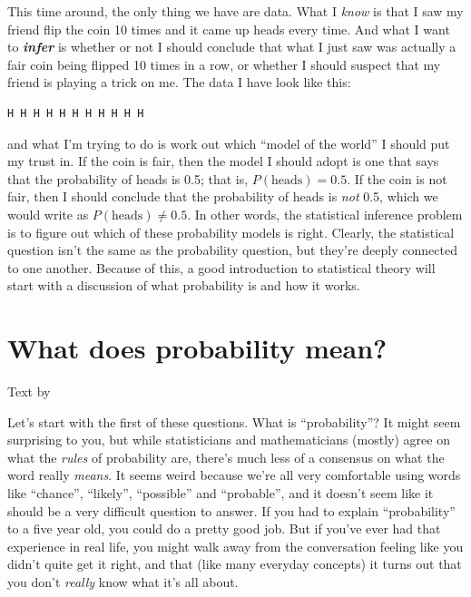 \documentclass[
]{book}
\begin{document}
This time around, the only thing we have are data. What I \emph{know} is that I saw my friend flip the coin 10 times and it came up heads every time. And what I want to \textbf{\emph{infer}} is whether or not I should conclude that what I just saw was actually a fair coin being flipped 10 times in a row, or whether I should suspect that my friend is playing a trick on me. The data I have look like this:

\begin{verbatim}
H H H H H H H H H H H
\end{verbatim}

and what I'm trying to do is work out which ``model of the world'' I should put my trust in. If the coin is fair, then the model I should adopt is one that says that the probability of heads is 0.5; that is, \(P(\mbox{heads}) = 0.5\). If the coin is not fair, then I should conclude that the probability of heads is \emph{not} 0.5, which we would write as \(P(\mbox{heads}) \neq 0.5\). In other words, the statistical inference problem is to figure out which of these probability models is right. Clearly, the statistical question isn't the same as the probability question, but they're deeply connected to one another. Because of this, a good introduction to statistical theory will start with a discussion of what probability is and how it works.

\hypertarget{probmeaning}{%
\section{What does probability mean?}\label{probmeaning}}

Text by \citet{Navarro2018}

Let's start with the first of these questions. What is ``probability''? It might seem surprising to you, but while statisticians and mathematicians (mostly) agree on what the \emph{rules} of probability are, there's much less of a consensus on what the word really \emph{means}. It seems weird because we're all very comfortable using words like ``chance'', ``likely'', ``possible'' and ``probable'', and it doesn't seem like it should be a very difficult question to answer. If you had to explain ``probability'' to a five year old, you could do a pretty good job. But if you've ever had that experience in real life, you might walk away from the conversation feeling like you didn't quite get it right, and that (like many everyday concepts) it turns out that you don't \emph{really} know what it's all about.
\end{document}
